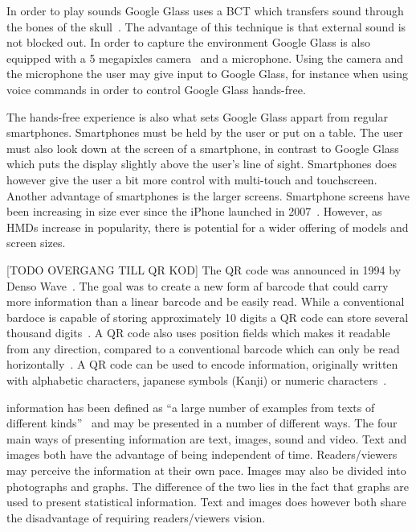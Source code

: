 In order to play sounds Google Glass uses a BCT which transfers sound through the bones of the skull~\cite{GlassSpecs}. The advantage of this technique is that external sound is not blocked out. In order to capture the environment Google Glass is also equipped with a 5 megapixles camera~\cite{GlassSpecs} and a microphone. Using the camera and the microphone the user may give input to Google Glass, for instance when using voice commands in order to control Google Glass hands-free.

The hands-free experience is also what sets Google Glass appart from regular smartphones. Smartphones must be held by the user or put on a table. The user must also look down at the screen of a smartphone, in contrast to Google Glass which puts the display slightly above the user's line of sight. Smartphones does however give the user a bit more control with multi-touch and touchscreen. Another advantage of smartphones is the larger screens. Smartphone screens have been increasing in size ever since the iPhone launched in 2007~\cite{smartphoneSizeChart2}. However, as HMDs increase in popularity, there is potential for a wider offering of models and screen sizes.

[TODO OVERGANG TILL QR KOD] The QR code was announced in 1994 by Denso Wave~\cite{qrCodeHistory}. The goal was to create a new form af barcode that could carry more information than a linear barcode and be easily read. While a conventional bardoce is capable of storing approximately 10 digits a QR code can store several thousand digits~\cite{qrCodeType}. A QR code also uses position fields which makes it readable from any direction, compared to a conventional barcode which can only be read horizontally~\cite{qrCodeAbout}. A QR code can be used to encode information, originally written with alphabetic characters, japanese symbols (Kanji) or numeric characters~\cite{qrCodeVersion}. 

information has been defined as ``a large number of examples from texts of different kinds''~\cite{informationDef1} and may be presented in a number of different ways. The four main ways of presenting information are text, images, sound and video. Text and images both have the advantage of being independent of time. Readers/viewers may perceive the information at their own pace. Images may also be divided into photographs and graphs. The difference of the two lies in the fact that graphs are used to present statistical information. Text and images does however both share the disadvantage of requiring readers/viewers vision.

